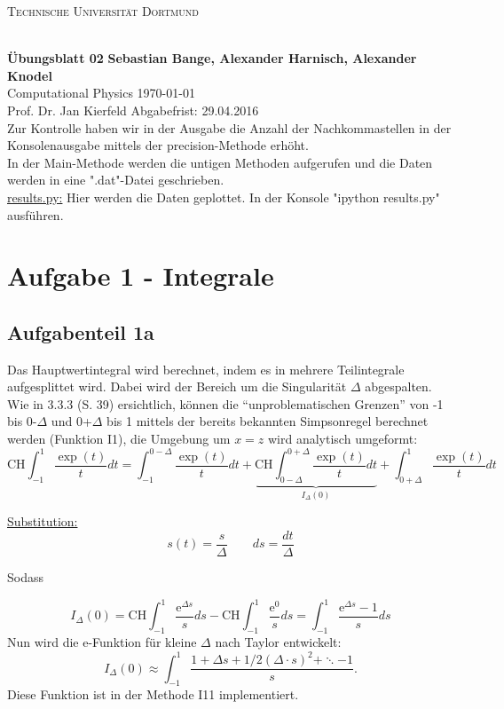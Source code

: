 
\usepackage{hyperref}

\noindent
\centerline{\small{\textsc{Technische Universität Dortmund}}} \\
\large\textbf{Übungsblatt 02} \hfill \footnotesize\textbf{Sebastian Bange, Alexander Harnisch, Alexander Knodel} \\
\normalsize Computational Physics \hfill \today \\
Prof. Dr. Jan Kierfeld \hfill Abgabefrist: 29.04.2016\\
\noindent\makebox[\linewidth]{\rule{\textwidth}{0.4pt}}
Zur Kontrolle haben wir in der Ausgabe die Anzahl der Nachkommastellen in der Konsolenausgabe mittels der precision-Methode erhöht.\\
In der Main-Methode werden die untigen Methoden aufgerufen und die Daten werden in eine ".dat"-Datei geschrieben. \\
\underline{results.py:}
Hier werden die Daten geplottet. In der Konsole "ipython results.py" ausführen.
\section*{Aufgabe 1 - Integrale}
\subsection*{Aufgabenteil 1a}
Das Hauptwertintegral wird berechnet, indem es in mehrere Teilintegrale aufgesplittet wird. Dabei wird der Bereich um die Singularität $\Delta$ abgespalten. Wie in 3.3.3 (S. 39) ersichtlich, können die \enquote{unproblematischen Grenzen} von -1 bis 0-$\Delta$ und 0+$\Delta$ bis 1 mittels der bereits bekannten Simpsonregel berechnet werden (Funktion I1), die Umgebung um $x = z$ wird analytisch umgeformt:
\begin{equation*}
\text{CH} \int_{-1}^{1} \frac{\exp(t)}{t} dt = \int_{-1}^{0-\Delta}\frac{\exp(t)}{t}dt+\underbrace{\text{CH}\int_{0-\Delta}^{0+\Delta}\frac{\exp(t)}{t}dt}_{I_{\Delta}(0)}+\int_{0+\Delta}^1\frac{\exp(t)}{t}dt
\end{equation*}

\underline{Substitution:}
\begin{equation*}
s(t) = \frac{s}{\Delta} \qquad ds = \frac{dt}{\Delta}
\end{equation*}

Sodass

\begin{equation*}
I_{\Delta}(0) = \text{CH} \int_{-1}^{1} \frac{\mathup{e}^{\Delta s}}{s} ds - \text{CH} \int_{-1}^1 \frac{\mathup{e}^0}{s} ds = \int_{-1}^{1} \frac{\mathup{e}^{\Delta s}-1}{s} ds
\end{equation*}
Nun wird die e-Funktion für kleine $\Delta$ nach Taylor entwickelt:
\begin{equation*}
I_{\Delta}(0) \approx \int_{-1}^{1} \frac{1+\Delta s + 1/2 \left(\Delta \cdot s\right)^2 + \ddots -1}{s} .
\end{equation*}
Diese Funktion ist in der Methode I11 implementiert.

